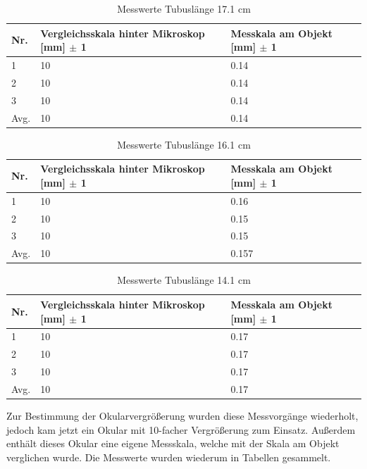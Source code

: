 \documentclass[12pt,a4paper,twoside]{article}
\begin{document}
\begin{table}[H]
    \centering
    \caption{Messwerte Tubuslänge 17.1 cm}
    \label{tab:messwerteTB17}
    \begin{tabular}{| l | l | l |}
        \hline
        Nr.   & Vergleichsskala hinter Mikroskop [mm] $\pm$ 1 & Messkala am Objekt [mm] $\pm$ 1 \\
        \hline
        1 & 10 & 0.14 \\
        2 & 10 & 0.14 \\
        3 & 10 & 0.14 \\
        \hline
        Avg. & 10 & 0.14 \\
        \hline
    \end{tabular}
\end{table}

\begin{table}[H]
    \centering
    \caption{Messwerte Tubuslänge 16.1 cm}
    \label{tab:messwerteTB16}
    \begin{tabular}{| l | l | l |}
        \hline
        Nr.   & Vergleichsskala hinter Mikroskop [mm] $\pm$ 1 & Messkala am Objekt [mm] $\pm$ 1\\
        \hline
        1 & 10 & 0.16 \\
        2 & 10 & 0.15 \\
        3 & 10 & 0.15 \\
        \hline
        Avg. & 10 & 0.157 \\
        \hline
    \end{tabular}
\end{table}

\begin{table}[H]
    \centering
    \caption{Messwerte Tubuslänge 14.1 cm}
    \label{tab:messwerteTB14}
    \begin{tabular}{| l | l | l |}
        \hline
        Nr.   & Vergleichsskala hinter Mikroskop [mm] $\pm$ 1 & Messkala am Objekt [mm] $\pm$ 1 \\
        \hline
        1 & 10 & 0.17 \\
        2 & 10 & 0.17 \\
        3 & 10 & 0.17 \\
        \hline
        Avg. & 10 & 0.17 \\
        \hline
    \end{tabular}
\end{table}

\noindent
Zur Bestimmung der Okularvergrößerung wurden diese Messvorgänge wiederholt, jedoch kam jetzt ein Okular mit 10-facher Vergrößerung zum Einsatz. 
Außerdem enthält dieses Okular eine eigene Messskala, welche mit der Skala am Objekt verglichen wurde.
Die Messwerte wurden wiederum in Tabellen gesammelt.
\end{document}
